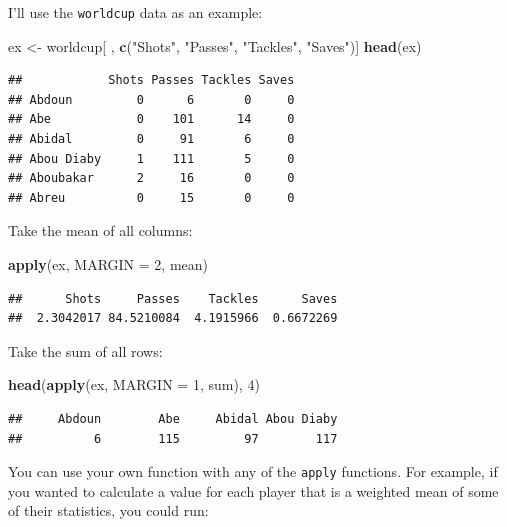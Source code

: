 \documentclass[]{book}
\makeatletter
\newenvironment{Shaded}{\begin{snugshade}}{\end{snugshade}}
\newcommand{\KeywordTok}[1]{\textcolor[rgb]{0.13,0.29,0.53}{\textbf{#1}}}
\newcommand{\DataTypeTok}[1]{\textcolor[rgb]{0.13,0.29,0.53}{#1}}
\newcommand{\DecValTok}[1]{\textcolor[rgb]{0.00,0.00,0.81}{#1}}
\newcommand{\StringTok}[1]{\textcolor[rgb]{0.31,0.60,0.02}{#1}}
\newcommand{\NormalTok}[1]{#1}
\newenvironment{kframe}{%
\medskip{}
\setlength{\fboxsep}{.8em}
 \def\at@end@of@kframe{}%
 \ifinner\ifhmode%
  \def\at@end@of@kframe{\end{minipage}}%
  \begin{minipage}{\columnwidth}%
 \fi\fi%
 \def\FrameCommand##1{\hskip\@totalleftmargin \hskip-\fboxsep
 \colorbox{shadecolor}{##1}\hskip-\fboxsep
     \hskip-\linewidth \hskip-\@totalleftmargin \hskip\columnwidth}%
 \MakeFramed {\advance\hsize-\width
   \@totalleftmargin\z@ \linewidth\hsize
   \@setminipage}}%
 {\par\unskip\endMakeFramed%
 \at@end@of@kframe}
\renewenvironment{Shaded}{\begin{kframe}}{\end{kframe}}
\theoremstyle{definition}
\theoremstyle{definition}
\theoremstyle{definition}
\theoremstyle{remark}
\makeatother
\begin{document}
I'll use the \texttt{worldcup} data as an example:

\begin{Shaded}
\begin{Highlighting}[]
\NormalTok{ex <-}\StringTok{ }\NormalTok{worldcup[ , }\KeywordTok{c}\NormalTok{(}\StringTok{"Shots"}\NormalTok{, }\StringTok{"Passes"}\NormalTok{, }\StringTok{"Tackles"}\NormalTok{, }\StringTok{"Saves"}\NormalTok{)]}
\KeywordTok{head}\NormalTok{(ex)}
\end{Highlighting}
\end{Shaded}

\begin{verbatim}
##            Shots Passes Tackles Saves
## Abdoun         0      6       0     0
## Abe            0    101      14     0
## Abidal         0     91       6     0
## Abou Diaby     1    111       5     0
## Aboubakar      2     16       0     0
## Abreu          0     15       0     0
\end{verbatim}

Take the mean of all columns:

\begin{Shaded}
\begin{Highlighting}[]
\KeywordTok{apply}\NormalTok{(ex, }\DataTypeTok{MARGIN =} \DecValTok{2}\NormalTok{, mean)}
\end{Highlighting}
\end{Shaded}

\begin{verbatim}
##      Shots     Passes    Tackles      Saves 
##  2.3042017 84.5210084  4.1915966  0.6672269
\end{verbatim}

Take the sum of all rows:

\begin{Shaded}
\begin{Highlighting}[]
\KeywordTok{head}\NormalTok{(}\KeywordTok{apply}\NormalTok{(ex, }\DataTypeTok{MARGIN =} \DecValTok{1}\NormalTok{, sum), }\DecValTok{4}\NormalTok{)}
\end{Highlighting}
\end{Shaded}

\begin{verbatim}
##     Abdoun        Abe     Abidal Abou Diaby 
##          6        115         97        117
\end{verbatim}

You can use your own function with any of the \texttt{apply} functions.
For example, if you wanted to calculate a value for each player that is
a weighted mean of some of their statistics, you could run:
\end{document}
